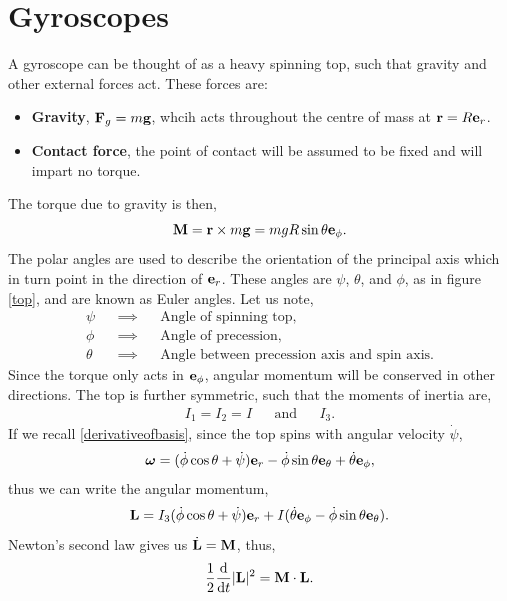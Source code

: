 \documentclass{book}
\begin{document}
\section{Gyroscopes}
A gyroscope can be thought of as a heavy spinning top, such that gravity and other external forces act. These forces are:
\begin{itemize}
	\item \textbf{Gravity}, $\vb{F}_g = m\vb{g}$, whcih acts throughout the centre of mass at $\vb{r} = R\vb{e}_r$. 
	\item \textbf{Contact force}, the point of contact will be assumed to be fixed and will impart no torque.
\end{itemize}
The torque due to gravity is then,
\begin{equation}
	\vb{M} = \vb{r} \times m\vb{g} = mg R \sin\theta \vb{e}_{\phi}. \label{torque due to gravity}
\end{equation}
The polar angles are used to describe the orientation of the principal axis which in turn point in the direction of $\vb{e}_r$. These angles are $\psi$, $\theta$, and $\phi$, as in figure \ref{top}, and are known as Euler angles. Let us note,
\begin{align}
	\psi && \implies && \text{Angle of spinning top,} \\
	\phi && \implies && \text{Angle of precession,} \\
	\theta && \implies && \text{Angle between precession axis and spin axis.}
\end{align} Since the torque only acts in $\vb{e}_{\phi}$, angular momentum will be conserved in other directions. The top is further symmetric, such that the moments of inertia are, 
\begin{align}
	I_1 = I_2 = I && \text{and} && I_3.
\end{align}
If we recall \eqref{derivativeofbasis}, since the top spins with angular velocity $\Dot{\psi}$,
\begin{equation}
	\vb*{\omega} = (\Dot{\phi}\cos\theta + \Dot{\psi})\vb{e}_r -\Dot{\phi}\sin\theta\vb{e}_{\theta} + \Dot{\theta}\vb{e}_{\phi},
\end{equation} 
thus we can write the angular momentum,
\begin{equation}
	\vb{L} = I_3(\Dot{\phi}\cos\theta + \Dot{\psi})\vb{e}_r + I(\Dot{\theta}\vb{e}_{\phi} - \Dot{\phi}\sin\theta\vb{e}_{\theta}).
\end{equation}
Newton's second law gives us $\Dot{\vb{L}} = \vb{M}$, thus, 
\begin{equation}
	\frac{1}{2}\dv{}{t}|\vb{L}|^2 = \vb{M}\cdot\vb{L}.
\end{equation}
\end{document}
